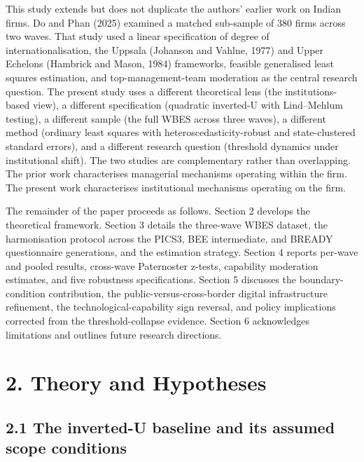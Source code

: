 \documentclass[
  12pt]{article}
\begin{document}
This study extends but does not duplicate the authors' earlier work on
Indian firms. Do and Phan (2025) examined a matched sub-sample of 380
firms across two waves. That study used a linear specification of degree
of internationalisation, the Uppsala (Johanson and Vahlne, 1977) and
Upper Echelons (Hambrick and Mason, 1984) frameworks, feasible
generalised least squares estimation, and top-management-team moderation
as the central research question. The present study uses a different
theoretical lens (the institutions-based view), a different
specification (quadratic inverted-U with Lind--Mehlum testing), a
different sample (the full WBES across three waves), a different method
(ordinary least squares with heteroscedasticity-robust and
state-clustered standard errors), and a different research question
(threshold dynamics under institutional shift). The two studies are
complementary rather than overlapping. The prior work characterises
managerial mechanisms operating within the firm. The present work
characterises institutional mechanisms operating on the firm.

The remainder of the paper proceeds as follows. Section 2 develops the
theoretical framework. Section 3 details the three-wave WBES dataset,
the harmonisation protocol across the PICS3, BEE intermediate, and
BREADY questionnaire generations, and the estimation strategy. Section 4
reports per-wave and pooled results, cross-wave Paternoster z-tests,
capability moderation estimates, and five robustness specifications.
Section 5 discusses the boundary-condition contribution, the
public-versus-cross-border digital infrastructure refinement, the
technological-capability sign reversal, and policy implications
corrected from the threshold-collapse evidence. Section 6 acknowledges
limitations and outlines future research directions.

\hypertarget{theory-and-hypotheses}{%
\section{2. Theory and Hypotheses}\label{theory-and-hypotheses}}

\hypertarget{the-inverted-u-baseline-and-its-assumed-scope-conditions}{%
\subsection{2.1 The inverted-U baseline and its assumed scope
conditions}\label{the-inverted-u-baseline-and-its-assumed-scope-conditions}}
\end{document}
